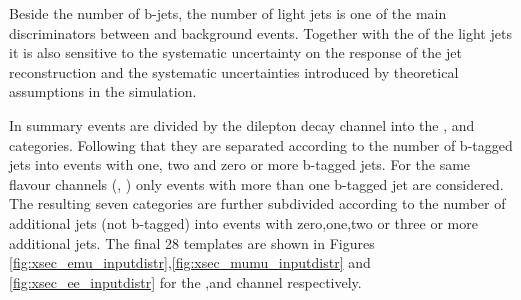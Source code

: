 Beside the number of b-jets, the number of light jets is one of the main discriminators between \ttbar and background events.
Together with the \pt of the light jets it is also sensitive to the systematic uncertainty on the response of the jet reconstruction and
the systematic uncertainties introduced by theoretical assumptions in the simulation.

In summary events are divided by the dilepton decay channel into the \emu, \ee and \mumu categories. Following that they are separated according to the number of b-tagged jets into events with one, two and zero or more b-tagged jets. For the same flavour channels (\ee, \mumu) only events with more than one b-tagged jet are considered. The resulting seven categories are further subdivided according to the number of additional jets (not b-tagged) into events with zero,one,two or three or more additional jets. The final 28 templates are shown in Figures 
 \ref{fig:xsec_emu_inputdistr},\ref{fig:xsec_mumu_inputdistr} and \ref{fig:xsec_ee_inputdistr} for the \emu,\mumu and \ee channel respectively.

